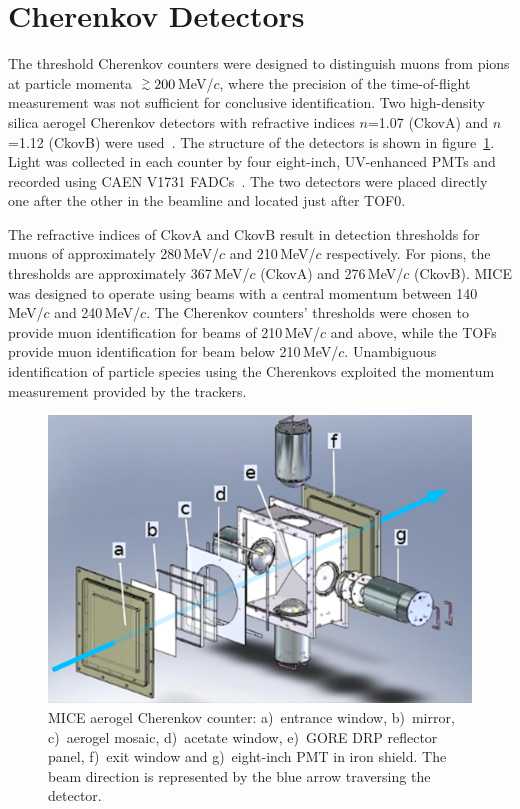 \graphicspath{{03-Ckov/Figures/}}

\section{Cherenkov Detectors}
\label{Sect:Ckov}

The threshold Cherenkov counters were designed to distinguish
muons from pions at particle momenta $\gsim 200$\,MeV/$c$, where
the precision of the time-of-flight measurement was not sufficient for
conclusive identification.
Two high-density silica aerogel Cherenkov detectors with refractive
indices $n$=1.07 (CkovA) and $n$=1.12 (CkovB) were used~\cite{Cremaldi:2009zj}.
The structure of the detectors is shown in figure~\ref{fig:ckov1}.
Light was collected in each counter by four eight-inch, UV-enhanced
PMTs and recorded using CAEN V1731 FADCs~\cite{NOTE473}.
The two detectors were placed directly one after the other in the
beamline and located just after TOF0.

The refractive indices of CkovA and CkovB result in detection
thresholds for muons of approximately 280\,MeV/$c$ and 210\,MeV/$c$ respectively.
For pions, the thresholds are approximately 367\,MeV/$c$ (CkovA) and
276\,MeV/$c$ (CkovB).
MICE was designed to operate using beams with a central momentum
between 140\,MeV/$c$ and 240\,MeV/$c$.
The Cherenkov counters' thresholds were chosen to provide muon identification for beams of 210\,MeV/$c$ and above, while the TOFs provide muon identification for beam below 210\,MeV/$c$.
Unambiguous identification of particle species using the Cherenkovs
exploited the momentum measurement provided by the trackers. \\
\begin{figure}[htb]
  \begin{center}
    \includegraphics[width=0.65\columnwidth]{./03-Ckov/Figures/Ckov_fix-with_beam.png}
  \end{center}
  \caption{
    MICE aerogel Cherenkov counter: a)~entrance window,
    b)~mirror, c)~aerogel mosaic, d)~acetate window, e)~GORE DRP reflector
    panel, f)~exit window and g)~eight-inch PMT in iron shield.
    The beam direction is represented by the blue arrow traversing the detector.
  } 
  \label{fig:ckov1}
\end{figure}

